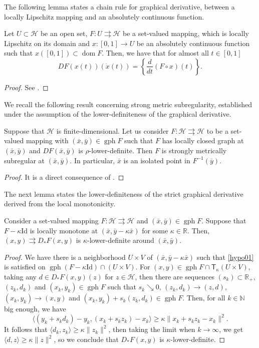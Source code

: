 \documentclass[smallextended,envcountsect,envcountsame]{svjour3}
\renewcommand{\H}{\mathcal{H}}
\newcommand{\R}{\mathbb{R}}
\newcommand{\N}{\mathbb{N}}
\newcommand{\tto}{\rightrightarrows}
\newcommand{\gph}{\operatorname{gph}}
\newcommand{\dom}{\operatorname{dom}}
\newcommand{\1}{\mathds{1}}
\begin{document}
	The following lemma states a chain rule for graphical derivative, between a locally Lipschitz mapping and an absolutely continuous function.
	\begin{lemma}\label{lemma_cotingent_lips}
		Let $U\subset \H$ be an open set, $F\colon U\tto \H$ be a set-valued mapping, which is locally Lipschitz on its domain and $x\colon [0,1]\to U$ be an absolutely continuous function such that $x([0,1])\subset \dom F$. Then, we have that for almost all $t\in [0,1]$  $$DF(x(t))(\dot{x}(t)) = \left\{ \frac{d}{dt}(F\circ x)(t) \right\}.$$
	\end{lemma}
	\begin{proof}
		See \cite[Theorem 5.3.2]{MR2458436}.    
	\end{proof}

    We recall the following result concerning strong metric subregularity, established under the assumption of the lower-definiteness of the graphical derivative.
	\begin{lemma}\label{st-met-sub-lemma}
		Suppose that $\H$ is finite-dimensional. Let us consider $F\colon \H\tto \H$ to be a set-valued mapping with $(\bar x,\bar y)\in \gph F$ such that $F$ has locally closed graph at $(\bar x,\bar y)$ and $DF(\bar x,\bar y)$ is $\rho$-lower-definite. Then $F$ is strongly metrically subregular at $(\bar x,\bar y)$. In particular, $\bar x$ is an isolated point in $F^{-1}(\bar y)$.
	\end{lemma}
	\begin{proof}
		It is a direct consequence of \cite[Theorem 4E.1]{MR3288139}.
	\end{proof}
    
    The next lemma states the lower-definiteness of the strict graphical derivative derived from the local monotonicity.
	\begin{lemma}\label{slm-low-def}
		Consider a set-valued mapping $F\colon \H\tto \H$ and $(\bar x,\bar y)\in \gph F$. Suppose that $F-\kappa\text{Id}$ is locally monotone at $(\bar x,\bar y-\kappa\bar x)$ for some $\kappa\in\R$. Then, $(x,y)\tto D_\ast F(x,y)$ is $\kappa$-lower-definite around $(\bar x,\bar y)$.
	\end{lemma}
	\begin{proof}
		We have there is a neighborhood $U\times V$ of $(\bar x , \bar y - \kappa\bar x)$ such that \eqref{hypo01} is satisfied on $\gph (F-\kappa\text{Id})\cap (U\times V)$. For $(x,y)\in \gph F\cap \mathsf{T}_{\kappa}(U\times V)$, taking any $d\in D_\ast F(x ,y)(z)$ for $z\in \H$, then there are sequences $(s_k)\subset \R_+$, $(z_k,d_k)$ and $(x_k,y_k)\in \gph F$ such that $s_k\searrow 0$, $(z_k,d_k)\to (z,d)$, $(x_k,y_k)\to (x,y)$ and $(x_k ,y_k) + s_k(z_k,d_k)\in \gph F$. Then, for all $k\in\N$ big enough, we have
		\begin{equation*}
			\langle (y_k + s_k d_k) - y_k,(x_k + s_k z_k) -x_k \rangle \geq \kappa\|x_k + s_k z_k - x_k\|^2.
		\end{equation*}
		It follows that $\langle d_k,z_k\rangle\geq \kappa\|z_k\|^2$, then taking the limit when $k\to \infty$, we get $\langle d,z\rangle\geq \kappa\|z\|^2$, so we conclude that $D_\ast F(x,y)$ is $\kappa$-lower-definite.
	\end{proof}
	
\end{document}
